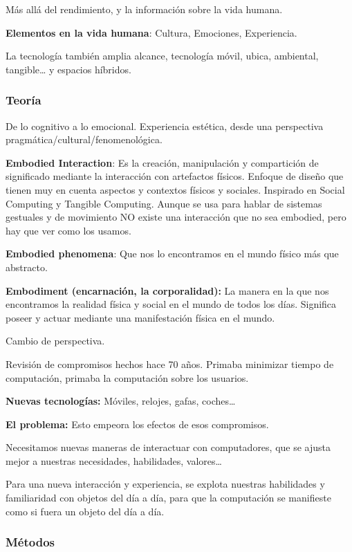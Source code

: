 \documentclass[12pt]{report} %
\begin{document}
Más allá del rendimiento, y la información sobre la vida humana.

\textbf{Elementos en la vida humana}: Cultura, Emociones, Experiencia.

La tecnología también amplia alcance, tecnología móvil, ubica,
ambiental, tangible\ldots{} y espacios híbridos.

\subsubsection{Teoría}

De lo cognitivo a lo emocional. Experiencia estética, desde una
perspectiva pragmática/cultural/fenomenológica.

\textbf{Embodied Interaction}: Es la creación, manipulación y
compartición de significado mediante la interacción con artefactos
físicos. Enfoque de diseño que tienen muy en cuenta aspectos y contextos
físicos y sociales. Inspirado en Social Computing y Tangible Computing.
Aunque se usa para hablar de sistemas gestuales y de movimiento NO
existe una interacción que no sea embodied, pero hay que ver como los
usamos.

\textbf{Embodied phenomena}: Que nos lo encontramos en el mundo físico
más que abstracto.

\textbf{Embodiment (encarnación, la corporalidad):} La manera en la que
nos encontramos la realidad física y social en el mundo de todos los
días. Significa poseer y actuar mediante una manifestación física en el
mundo.

Cambio de perspectiva.

Revisión de compromisos hechos hace 70 años. Primaba minimizar tiempo de
computación, primaba la computación sobre los usuarios.

\textbf{Nuevas tecnologías:} Móviles, relojes, gafas, coches\ldots{}

\textbf{El problema:} Esto empeora los efectos de esos compromisos.

Necesitamos nuevas maneras de interactuar con computadores, que se
ajusta mejor a nuestras necesidades, habilidades, valores\ldots{}

Para una nueva interacción y experiencia, se explota nuestras habilidades
y familiaridad con objetos del día a día, para que la computación se
manifieste como si fuera un objeto del día a día.

\subsubsection{Métodos}
\end{document}
